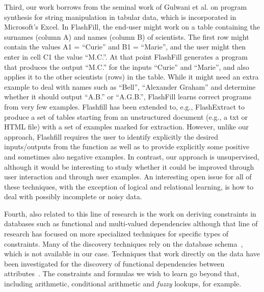 Third, our work borrows from the seminal work of Gulwani et al. \cite{flashfill} on program synthesis for string manipulation in tabular data, which is incorporated in Microsoft's Excel. In FlashFill, the end-user might work on a table containing the surnames (column A) and names (column B) of scientists. The first row might contain the values A1 = ``Curie'' and B1 = ``Marie'', and the user might then enter in cell C1 the value ``M.C.''. At that point FlashFill generates a program that produces the output ``M.C.'' for the inputs ``Curie'' and ``Marie'', and also applies it to the other scientists (rows) in the table. While it might need an extra example to deal with names such as ``Bell'', ``Alexander Graham'' and determine whether it should output ``A.B.'' or ``A.G.B.'', FlashFill learns correct programs from very few examples. Flashfill has been extended to, e.g., FlashExtract \cite{flashextract} to produce a set of tables starting from an unstructured document (e.g., a txt or HTML file) with a set of examples marked for extraction. However, unlike our approach, Flashfill requires the user to identify explicitly the desired inputs/outputs from the function as well as to provide explicitly some positive and sometimes also negative examples.  In contrast, our approach is unsupervised, although it would be interesting to study whether it could be improved through user interaction and through user examples.  An interesting open issue for all of these techniques, with the exception of logical and relational learning, is how to deal with possibly incomplete or noisy data.

Fourth, also related to this line of research is the work on deriving constraints in databases such as functional and multi-valued dependencies \cite{savnik, Mannila-Raiha} although that line of research has focused on more specialized techniques for specific types of constraints. Many of the discovery techniques rely on the database schema~\cite{flach_dependency_discovery}, which is not available in our case. Techniques that work directly on the data have been investigated for the discovery of functional dependencies between attributes~\cite{tane_dependency_discovery}. The constraints and formulas we wish to learn go beyond that, including arithmetic, conditional arithmetic and \textit{fuzzy} lookups, for example.

